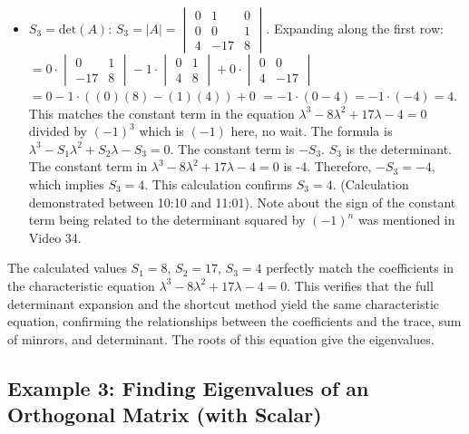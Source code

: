 \documentclass{article}
\begin{document}
\begin{itemize}
    \item $S_3 = \text{det}(A)$:
    $S_3 = |A| = \begin{vmatrix} 0 & 1 & 0 \\ 0 & 0 & 1 \\ 4 & -17 & 8 \end{vmatrix}$. Expanding along the first row:
    $= 0 \cdot \begin{vmatrix} 0 & 1 \\ -17 & 8 \end{vmatrix} - 1 \cdot \begin{vmatrix} 0 & 1 \\ 4 & 8 \end{vmatrix} + 0 \cdot \begin{vmatrix} 0 & 0 \\ 4 & -17 \end{vmatrix}$
    $= 0 - 1 \cdot ((0)(8) - (1)(4)) + 0$
    $= -1 \cdot (0 - 4) = -1 \cdot (-4) = 4$.
    This matches the constant term in the equation $\lambda^3 - 8\lambda^2 + 17\lambda - 4 = 0$ divided by $(-1)^3$ which is $(-1)$ here, no wait. The formula is $\lambda^3 - S_1 \lambda^2 + S_2 \lambda - S_3 = 0$. The constant term is $-S_3$. $S_3$ is the determinant. The constant term in $\lambda^3 - 8\lambda^2 + 17\lambda - 4 = 0$ is -4. Therefore, $-S_3 = -4$, which implies $S_3 = 4$. This calculation confirms $S_3 = 4$. (Calculation demonstrated between 10:10 and 11:01). Note about the sign of the constant term being related to the determinant squared by $(-1)^n$ was mentioned in Video 34.

\end{itemize}
The calculated values $S_1=8$, $S_2=17$, $S_3=4$ perfectly match the coefficients in the characteristic equation $\lambda^3 - 8\lambda^2 + 17\lambda - 4 = 0$. This verifies that the full determinant expansion and the shortcut method yield the same characteristic equation, confirming the relationships between the coefficients and the trace, sum of minrors, and determinant. The roots of this equation give the eigenvalues.


\subsection{Example 3: Finding Eigenvalues of an Orthogonal Matrix (with Scalar)}
\end{document}
